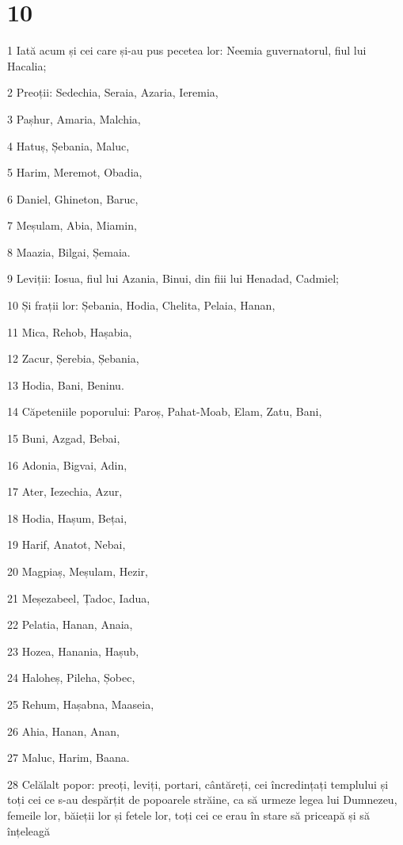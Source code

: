 \chapter{10}

\par 1 Iată acum și cei care și-au pus pecetea lor: Neemia guvernatorul, fiul lui Hacalia;
\par 2 Preoții: Sedechia, Seraia, Azaria, Ieremia,
\par 3 Pașhur, Amaria, Malchia,
\par 4 Hatuș, Șebania, Maluc,
\par 5 Harim, Meremot, Obadia,
\par 6 Daniel, Ghineton, Baruc,
\par 7 Meșulam, Abia, Miamin,
\par 8 Maazia, Bilgai, Șemaia.
\par 9 Leviții: Iosua, fiul lui Azania, Binui, din fiii lui Henadad, Cadmiel;
\par 10 Și frații lor: Șebania, Hodia, Chelita, Pelaia, Hanan,
\par 11 Mica, Rehob, Hașabia,
\par 12 Zacur, Șerebia, Șebania,
\par 13 Hodia, Bani, Beninu.
\par 14 Căpeteniile poporului: Paroș, Pahat-Moab, Elam, Zatu, Bani,
\par 15 Buni, Azgad, Bebai,
\par 16 Adonia, Bigvai, Adin,
\par 17 Ater, Iezechia, Azur,
\par 18 Hodia, Hașum, Bețai,
\par 19 Harif, Anatot, Nebai,
\par 20 Magpiaș, Meșulam, Hezir,
\par 21 Meșezabeel, Țadoc, Iadua,
\par 22 Pelatia, Hanan, Anaia,
\par 23 Hozea, Hanania, Hașub,
\par 24 Haloheș, Pileha, Șobec,
\par 25 Rehum, Hașabna, Maaseia,
\par 26 Ahia, Hanan, Anan,
\par 27 Maluc, Harim, Baana.
\par 28 Celălalt popor: preoți, leviți, portari, cântăreți, cei încredințați templului și toți cei ce s-au despărțit de popoarele străine, ca să urmeze legea lui Dumnezeu, femeile lor, băieții lor și fetele lor, toți cei ce erau în stare să priceapă și să înțeleagă
